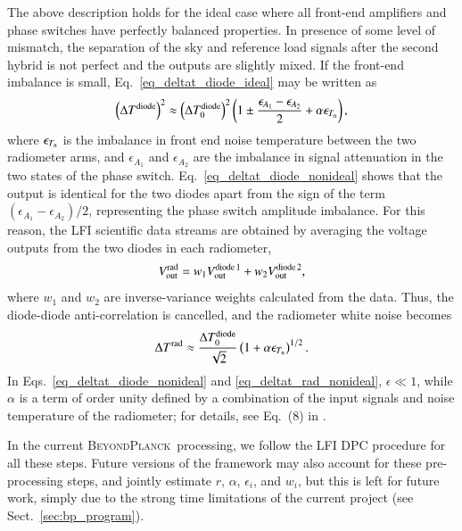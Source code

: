 \documentclass[onecolumn]{aa}
\newcommand{\BP}{\textsc{BeyondPlanck}}
\begin{document}
The above description holds for the ideal case where all front-end
amplifiers and phase switches have perfectly balanced properties.  In
presence of some level of mismatch, the separation of the sky and
reference load signals after the second hybrid is not perfect and the
outputs are slightly mixed. If the front-end imbalance is small,
Eq.~\eqref{eq_deltat_diode_ideal} may be written as
\begin{equation}
  \left(\Delta T^{\rm diode}\right)^2 \approx  \left(\Delta T_0^{\rm diode}\right)^2
  \left( 1 \pm \frac{\epsilon_{A_1}-\epsilon_{A_2}}{2} + \alpha\epsilon_{T_{\rm n}}\right),
  \label{eq_deltat_diode_nonideal}
\end{equation}
where $\epsilon_{T_{\rm n}}$ is the imbalance in front end noise
temperature between the two radiometer arms, and $\epsilon_{A_1}$ and
$\epsilon_{A_2}$ are the imbalance in signal attenuation in the two
states of the phase switch. Eq.~\eqref{eq_deltat_diode_nonideal}
shows that the output is identical for the two diodes apart from the
sign of the term $(\epsilon_{A_1}-\epsilon_{A_2})/2$, representing the
phase switch amplitude imbalance. For this reason, the LFI scientific
data streams are obtained by averaging the voltage outputs from the
two diodes in each radiometer,
\begin{equation}
  V_{\rm out}^{\rm rad} = w_1 V_{\rm out}^{\rm diode\, 1} + w_2 V_{\rm out}^{\rm diode\, 2},
  \label{eq_vout_radiometer}
\end{equation}
where $w_1$ and $w_2$ are inverse-variance weights calculated from the
data.  Thus, the diode-diode anti-correlation is cancelled, and the
radiometer white noise becomes
\begin{equation}
  \Delta T^{\rm rad} \approx  \frac{\Delta T_0^{\rm diode}}{\sqrt{2}}
  \left( 1  + \alpha\epsilon_{T_{\rm n}}\right)^{1/2}.
  \label{eq_deltat_rad_nonideal}
\end{equation}
In Eqs.~\eqref{eq_deltat_diode_nonideal} and
\eqref{eq_deltat_rad_nonideal}, $\epsilon\ll 1$, while $\alpha$ is a
term of order unity defined by a combination of the input signals and
noise temperature of the radiometer; for details, see Eq.~(8) in
\citet{planck2011-1.4}.

In the current \BP\ processing, we follow the LFI DPC procedure for
all these steps. Future versions of the framework may also account for
these pre-processing steps, and jointly estimate $r$, $\alpha$,
$\epsilon_i$, and $w_i$, but this is left for future work, simply due
to the strong time limitations of the current project (see
Sect.~\ref{sec:bp_program}).
\end{document}
